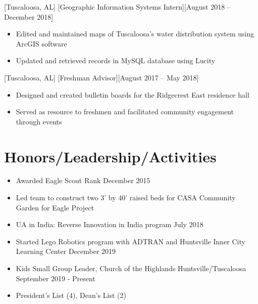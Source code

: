 \documentclass[hidelinks, 11pt]{article}
\begin{document}
[Tuscaloosa, AL]
[Geographic Information Systems Intern][August 2018 – December 2018]

\begin{itemize}
  \item Edited and maintained maps of Tuscaloosa’s water distribution system using ArcGIS software
  \item Updated and retrieved records in MySQL database using Lucity
\end{itemize}

[Tuscaloosa, AL]
[Freshman Advisor][August 2017 – May 2018]

\begin{itemize}
  \item Designed and created bulletin boards for the Ridgecrest East residence hall
  \item Served as resource to freshmen and facilitated community engagement through events
\end{itemize}

\section{Honors/Leadership/Activities}

\begin{itemize}
  \item Awarded Eagle Scout Rank \hfill December 2015
  \item Led team to construct two 3' by 40' raised beds for CASA Community Garden for Eagle Project
  \item UA in India: Reverse Innovation in India program \hfill July 2018
  \item Started Lego Robotics program with ADTRAN and Huntsville Inner City Learning Center \hfill December 2019
  \item Kids Small Group Leader, Church of the Highlands Huntsville/Tuscaloosa \hfill September 2019 - Present
  \item President's List (4), Dean's List (2)
\end{itemize}
\end{document}
